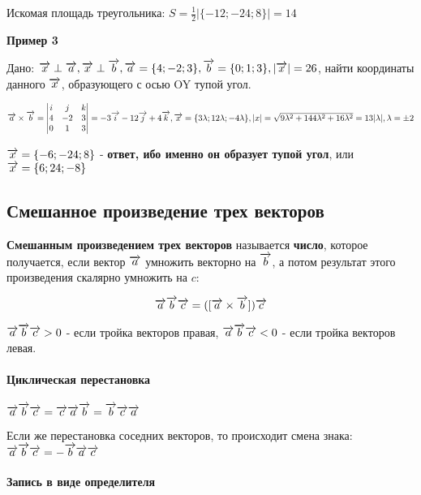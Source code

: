 \documentclass{article}
\def\vec{\ensuremath\overrightarrow}
\begin{document}
\begin{flushleft}
Искомая площадь треугольника: $S = \frac{1}{2} |\{ -12; -24; 8 \}| = 14$

\hfill

\textbf{Пример 3}

Дано: $\vec{x} \perp \vec{a}, \vec{x} \perp \vec{b}, \vec{a} = \{ 4; -2; 3\}, \vec{b} = \{ 0; 1; 3 \}, |\vec{x}| = 26$, найти координаты данного $\vec{x}$, образующего с осью OY тупой угол.

$\vec{a} \times \vec{b} = \begin{vmatrix}
    i & j & k \\
    4 & -2 & 3 \\
    0 & 1 & 3
\end{vmatrix} = -3\vec{i} - 12\vec{j} + 4\vec{k}, \vec{x} = \{ 3 \lambda; 12 \lambda; -4 \lambda \}, |x| = \sqrt{9\lambda^2 + 144\lambda^2 + 16\lambda^2} = 13|\lambda|, \lambda = \pm 2$

$\vec{x} = \{ -6; -24; 8 \}$ - \textbf{ответ, ибо именно он образует тупой угол}, или $\vec{x} = \{ 6; 24; -8 \}$

\pagebreak
\subsection{Смешанное произведение трех векторов}

\textbf{Смешанным произведением трех векторов} называется \textbf{число}, которое получается, если вектор $\vec{a}$ умножить векторно на $\vec{b}$, а потом результат этого произведения скалярно умножить на $c$:

$$\vec{a} \vec{b} \vec{c} = ([\vec{a} \times \vec{b}]) \vec{c}$$

$\vec{a} \vec{b} \vec{c} > 0$ - если тройка векторов правая, $\vec{a} \vec{b} \vec{c} < 0$ - если тройка векторов левая.

\paragraph{Циклическая перестановка}

$\vec{a} \vec{b} \vec{c} = \vec{c} \vec{a} \vec{b} = \vec{b} \vec{c} \vec{a}$

Если же перестановка соседних векторов, то происходит смена знака: $\vec{a} \vec{b} \vec{c} = - \vec{b} \vec{a} \vec{c}$

\paragraph{Запись в виде определителя}


\end{flushleft}
\end{document}

